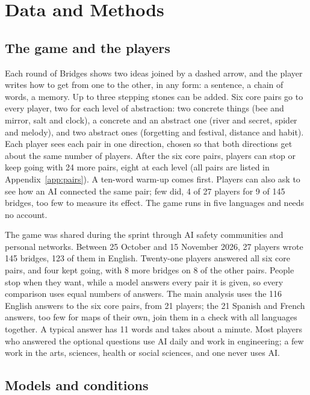 \documentclass[11pt]{article}
\begin{document}
\section{Data and Methods}

\subsection{The game and the players}
\label{sec:game}

Each round of Bridges shows two ideas joined by a dashed arrow, and the player writes how to get from one to the other, in any form: a sentence, a chain of words, a memory. Up to three stepping stones can be added. Six core pairs go to every player, two for each level of abstraction: two concrete things (bee and mirror, salt and clock), a concrete and an abstract one (river and secret, spider and melody), and two abstract ones (forgetting and festival, distance and habit). Each player sees each pair in one direction, chosen so that both directions get about the same number of players. After the six core pairs, players can stop or keep going with 24 more pairs, eight at each level (all pairs are listed in Appendix~\ref{app:pairs}). A ten-word warm-up comes first. Players can also ask to see how an AI connected the same pair; few did, 4 of 27 players for 9 of 145 bridges, too few to measure its effect. The game runs in five languages and needs no account.

The game was shared during the sprint through AI safety communities and personal networks. Between 25 October and 15 November 2026, 27 players wrote 145 bridges, 123 of them in English. Twenty-one players answered all six core pairs, and four kept going, with 8 more bridges on 8 of the other pairs. People stop when they want, while a model answers every pair it is given, so every comparison uses equal numbers of answers. The main analysis uses the 116 English answers to the six core pairs, from 21 players; the 21 Spanish and French answers, too few for maps of their own, join them in a check with all languages together. A typical answer has 11 words and takes about a minute. Most players who answered the optional questions use AI daily and work in engineering; a few work in the arts, sciences, health or social sciences, and one never uses AI.

\subsection{Models and conditions}
\label{sec:models}
\end{document}
